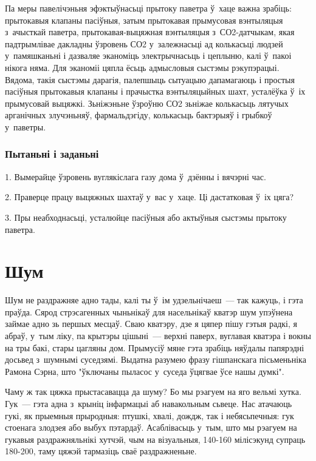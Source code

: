 Па меры павелічэньня эфэктыўнасьці прытоку паветра ў~хаце важна зрабіць: прытокавыя клапаны пасіўныя, затым прытокавая прымусовая вэнтыляцыя з~ачысткай паветра, прытокавая-выцяжная вэнтыляцыя з~СО2-датчыкам, якая падтрымлівае дакладны ўзровень СО2 у~залежнасьці ад колькасьці людзей у~памяшканьні і дазваляе эканоміць электрычнасьць і цеплыню, калі ў~пакоі нікога няма. Для эканоміі цяпла ёсьць адмысловыя сыстэмы рэкупэрацыі. Вядома, такія сыстэмы дарагія, палепшыць сытуацыю дапамагаюць і простыя пасіўныя прытокавыя клапаны і прачыстка вэнтыляцыйных шахт, усталёўка ў~іх прымусовай выцяжкі. Зьніжэньне ўзроўню СО2 зьніжае колькасьць лятучых арганічных злучэньняў, фармальдэгіду, колькасьць бактэрыяў і грыбкоў у~паветры.

\subsubsection{Пытаньні і заданьні}

1. Вымерайце ўзровень вуглякіслага газу дома ў~дзённы і вячэрні час.

2. Праверце працу выцяжных шахтаў у~вас у~хаце. Ці дастатковая ў~іх цяга?

3. Пры неабходнасьці, усталюйце пасіўныя або актыўныя сыстэмы прытоку паветра.


\section{Шум}

Шум не раздражняе адно тады, калі ты ў~ім удзельнічаеш~--- так кажуць, і гэта праўда. Сярод стрэсагенных чыньнікаў для насельнікаў кватэр шум упэўнена займае адно зь першых месцаў. Сваю кватэру, дзе я цяпер пішу гэтыя радкі, я абраў, у~тым ліку, па крытэры цішыні~--- верхні паверх, вуглавая кватэра і вокны на тры бакі, стары цагляны дом. Прымусіў мяне гэта зрабіць няўдалы папярэдні досьвед з~шумнымі суседзямі. Выдатна разумею фразу гішпанскага пісьменьніка Рамона Сэрна, што "ўключаны пыласос у~суседа ўцягвае ўсе нашы думкі".

Чаму ж так цяжка прыстасавацца да шуму? Бо мы рэагуем на яго вельмі хутка. Гук~--- гэта адна з~крыніц інфармацыі аб навакольным сьвеце. Нас атачаюць гукі, як прыемныя прыродныя: птушкі, хвалі, дождж, так і небясьпечныя: гук стоенага злодзея або выбух пэтардаў. Асаблівасьць у~тым, што мы рэагуем на гукавыя раздражняльнікі хутчэй, чым на візуальныя, 140-160 мілісэкунд супраць 180-200, таму цяжэй тармазіць сваё раздражненьне.

